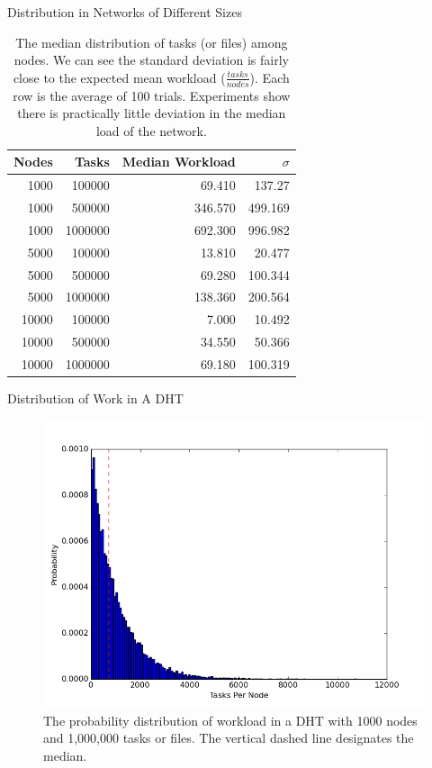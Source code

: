 \documentclass[11pt]{beamer}
\begin{document}
\begin{frame}{Distribution in Networks of Different Sizes}
\begin{table}
	\centering
	\caption{The median distribution of tasks (or files) among nodes.  We can see the standard deviation is fairly close to the expected mean workload ($\frac{tasks}{nodes}$). Each row is the average of 100 trials.  Experiments show there is practically little deviation in the median load of the network.}
	\begin{tabular}{r r r r}
		Nodes & Tasks & Median Workload & $\sigma$ \\ \hline
		1000 & 100000 & 69.410   &  137.27  \\
		1000 & 500000 & 346.570  &  499.169 \\
		1000 & 1000000 & 692.300  &  996.982 \\
		
		5000 & 100000  & 13.810 & 20.477 \\ 
		5000 & 500000  & 69.280 & 100.344 \\ 
		5000 & 1000000 &138.360 & 200.564 \\ 
		
		10000 & 100000 & 7.000   &  10.492 \\
		10000 & 500000 & 34.550  &   50.366 \\
		10000 & 1000000& 69.180  &  100.319 \\
	\end{tabular}
	\label{tab:medianLoads}
\end{table}

\end{frame}



\begin{frame}{Distribution of Work in A DHT}
\begin{figure}
	\centering
	\includegraphics[width=0.7\linewidth]{figs/workloadDistribution}
	\caption[Workload Distribution in a DHT]{The probability distribution of workload in a DHT with 1000 nodes and 1,000,000 tasks or files.  The vertical dashed line designates the median.}
	\label{fig:workloadDistribution}
\end{figure}
\end{frame}
\end{document}

